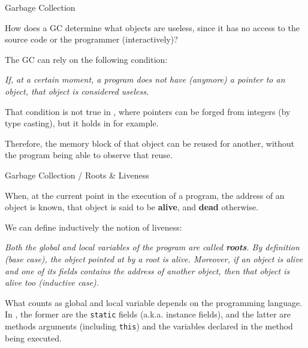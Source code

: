 \documentclass[compress,dvipdfmx]{beamer}
\begin{document}
%
\begin{frame}{Garbage Collection}

  How does a GC determine what objects are useless, since it has no
  access to the source code or the programmer (interactively)?

  \bigskip

  The GC can rely on the following condition:
  \begin{center}
    \it If, at a certain moment, a program does not have (anymore) a
    pointer to an object, that object is considered useless.
  \end{center}
  That condition is not true in \C, where pointers can be forged from
  integers (by type casting), but it holds in \Java for example.

  \bigskip

  Therefore, the memory block of that object can be reused for
  another, without the program being able to observe that reuse.

\end{frame}


%
\begin{frame}{Garbage Collection / Roots \& Liveness}

  When, at the current point in the execution of a program, the
  address of an object is known, that object is said to be
  \textbf{alive}, and \textbf{dead} otherwise.

  \bigskip

  We can define inductively the notion of liveness:
  \begin{definition}
    \it Both the global and local variables of the program are called
    \textbf{roots}. By definition (base case), the object pointed at
    by a root is alive. Moreover, if an object is alive and one of its
    fields contains the address of another object, then that object is
    alive too (inductive case).
  \end{definition}

  \medskip

  What counts as global and local variable depends on the programming
  language. In \Java, the former are the \texttt{static} fields
  (a.k.a. instance fields), and the latter are methods arguments
  (including \texttt{this}) and the variables declared in the method
  being executed.

\end{frame}
\end{document}
